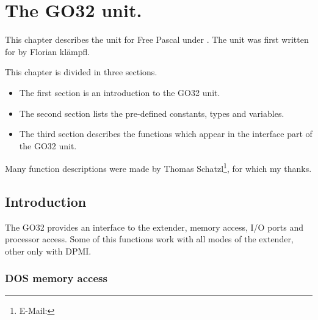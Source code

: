 %
%
%
%
%
\chapter{The GO32 unit.}
This chapter describes the  unit for Free Pascal under \dos.
The unit was first written for \dos by Florian kl\"ampfl. 

This chapter is divided in three sections. 
\begin{itemize}
\item The first section is an introduction to the GO32 unit.
\item The second section lists the pre-defined constants, types and variables. 
\item The third section describes the functions which appear in the
interface part of the GO32 unit.
\end{itemize}
Many function descriptions were made by Thomas Schatzl\footnote{
E-Mail: }, for which my thanks.

\section{Introduction}

The GO32 provides an interface to the \dos extender, \dos memory access,
I/O ports and processor access. Some of this functions work with all modes
of the extender, other only with DPMI.

\subsection{DOS memory access}

